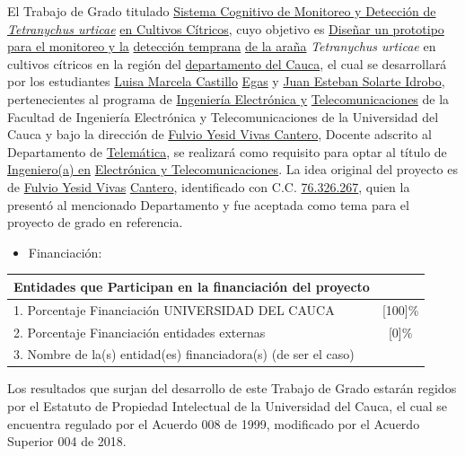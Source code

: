 \documentclass[12pt,letterpaper]{article}
\begin{document}
\noindent El Trabajo de Grado titulado \underline{Sistema Cognitivo de Monitoreo y Detección de \textit{Tetranychus urticae}} \underline{en Cultivos Cítricos}, cuyo objetivo es \underline{Diseñar un prototipo para el monitoreo y la} \underline{detección temprana} \underline{de la araña} \textit{Tetranychus urticae} en cultivos cítricos en la región del \underline{departamento del Cauca}, el cual se desarrollará por los estudiantes \underline{Luisa Marcela Castillo} \underline{Egas} y \underline{Juan Esteban Solarte Idrobo}, pertenecientes al programa de \underline{Ingeniería Electrónica y} \underline{Telecomunicaciones} de la Facultad de Ingeniería Electrónica y Telecomunicaciones de la Universidad del Cauca y bajo la dirección de \underline{Fulvio Yesid Vivas Cantero}, Docente adscrito al Departamento de \underline{Telemática}, se realizará como requisito para optar al título de \underline{Ingeniero(a) en} \underline{Electrónica y Telecomunicaciones}. La idea original del proyecto es de \underline{Fulvio Yesid Vivas} \underline{Cantero}, identificado con C.C. \underline{76.326.267}, quien la presentó al mencionado Departamento y fue aceptada como tema para el proyecto de grado en referencia.

\vspace{0.5cm}

\begin{itemize}
    \item Financiación:
\end{itemize}

\begin{table}[H]
\centering
\renewcommand{\arraystretch}{1.5} %
\begin{tabular}{|p{12cm}|c|}
\hline
Entidades que Participan en la financiación del proyecto & \\
\hline
1. Porcentaje Financiación UNIVERSIDAD DEL CAUCA & [100]\% \\
\hline
2. Porcentaje Financiación entidades externas & [0]\% \\
\hline
3. Nombre de la(s) entidad(es) financiadora(s) (de ser el caso) & \\
\hline
\end{tabular}
\end{table}

\vspace{0.5cm}

\noindent Los resultados que surjan del desarrollo de este Trabajo de Grado estarán regidos por el Estatuto de Propiedad Intelectual de la Universidad del Cauca, el cual se encuentra regulado por el Acuerdo 008 de 1999, modificado por el Acuerdo Superior 004 de 2018.
\end{document}
